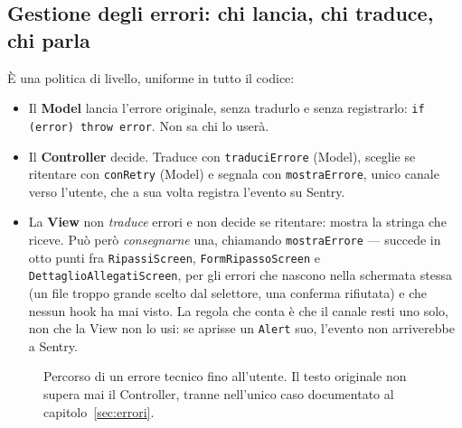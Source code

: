 \documentclass[11pt,a4paper]{report}
\begin{document}
\subsection*{Gestione degli errori: chi lancia, chi traduce, chi parla}

\`E una politica di livello, uniforme in tutto il codice:

\begin{itemize}[nosep]
  \item Il \textbf{Model} lancia l'errore originale, senza tradurlo e senza
        registrarlo: \texttt{if (error) throw error}. Non sa chi lo user\`a.
  \item Il \textbf{Controller} decide. Traduce con \texttt{traduciErrore}
        (Model), sceglie se ritentare con \texttt{conRetry} (Model) e segnala
        con \texttt{mostraErrore}, unico canale verso l'utente, che a sua volta
        registra l'evento su Sentry.
  \item La \textbf{View} non \emph{traduce} errori e non decide se ritentare:
        mostra la stringa che riceve. Pu\`o per\`o \emph{consegnarne} una,
        chiamando \texttt{mostraErrore} — succede in otto punti fra
        \texttt{RipassiScreen}, \texttt{FormRipassoScreen} e
        \texttt{DettaglioAllegatiScreen}, per gli errori che nascono nella
        schermata stessa (un file troppo grande scelto dal selettore, una
        conferma rifiutata) e che nessun hook ha mai visto. La regola che conta
        \`e che il canale resti uno solo, non che la View non lo usi: se
        aprisse un \texttt{Alert} suo, l'evento non arriverebbe a Sentry.
\end{itemize}

\begin{figure}[H]
\centering
{}
\caption{Percorso di un errore tecnico fino all'utente. Il testo originale non
supera mai il Controller, tranne nell'unico caso documentato al
capitolo~\ref{sec:errori}.}
\end{figure}
\end{document}
